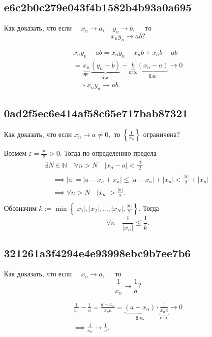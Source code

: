 \documentclass[11pt, a5paper]{article}
\newenvironment{note}[1]{\goodbreak\par\subsection{\hfill \color{lightgray}\tiny #1}}{}
\newenvironment{cloze}[2][\ldots]{\begin{leftbar}}{\end{leftbar}}
\begin{document}
    \begin{note}{e6c2b0c279e043f4b1582b4b93a0a695}
        Как доказать, что если \( \quad x_n \to a, \quad y_n \to b, \quad \) то \[
            x_n y_n \to ab?
        \]

        \begin{cloze}{1}
            \begin{multline*}
                x_n y_n - ab = x_n y_n - x_n b + x_n b - ab \\
                = \underbrace{x_n}_{\text{орг.}} \underbrace{(y_n -
                b)}_{\text{б.м.}} - \underbrace{b}_{\text{огр.}}
                \underbrace{(x_n - a)}_{\text{б.м.}} \longrightarrow 0 \\
                \implies x_n y_n \to ab.
            \end{multline*}
        \end{cloze}
    \end{note}

    \begin{note}{0ad2f5ec6e414af58c65e717bab87321}
        Как доказать, что если \( x_n \to a \neq 0,  \) то \( \left\{ \frac{1}{x_n} \right\} \) ограничена?

        \begin{cloze}{1}
            Возмем \( \varepsilon = \frac{|a|}{2} > 0. \) Тогда по определению предела \[
                \begin{gathered}
                    \exists N \in \mathbb N \quad \forall n > N \quad |x_n - a| < \frac{|a|}{2} \\
                    \begin{aligned}
                        &\implies |a| = |a - x_n + x_n| \leqslant |a - x_n| + |x_n| < \frac{|a|}{2} + |x_n| \\
                        &\implies \forall n > N \quad |x_n| > \frac{|a|}{2}. \\
                    \end{aligned}
                \end{gathered}
            \]
            Обозначим \( k := \min \left\{ |x_1|, |x_2|, \ldots, |x_N|, \frac{|a|}{2} \right\}. \) Тогда \[
                \forall n \quad \frac{1}{|x_n|} \leqslant \frac{1}{k}.
            \]
        \end{cloze}
    \end{note}

    \begin{note}{321261a3f4294e4e93998ebc9b7ee7b6}
        Как доказать, что если \( \quad x_n \to a, \quad \) то \[
            \frac{1}{x_n} \to \frac{1}{a}?
        \]

        \begin{cloze}{1}
            \begin{multline*}
                \frac{1}{x_n} - \frac{1}{a} = \frac{a - x_n}{x_n a} =
                \underbrace{(a - x_n)}_{\text{б.м.} }  \cdot
                \underbrace{\frac{1}{x_n a}}_{\text{огр.} } \to 0 \\
                \implies \frac{1}{x_n} \to \frac{1}{a}.
            \end{multline*}
        \end{cloze}
    \end{note}
\end{document}
